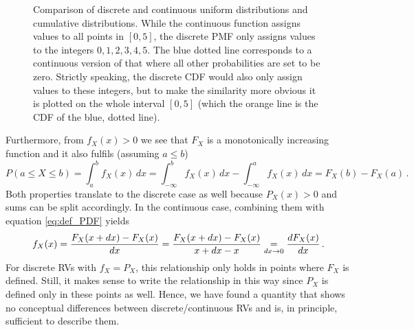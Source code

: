 \begin{figure}
\centering

%
\hspace{0.04\textwidth}%
%

\caption{Comparison of discrete and continuous uniform distributions and cumulative distributions. While the continuous function assigns values to all points in $[0, 5]$, the discrete PMF only assigns values to the integers $0, 1, 2, 3, 4, 5$. The blue dotted line corresponds to a continuous version of that where all other probabilities are set to be zero. Strictly speaking, the discrete CDF would also only assign values to these integers, but to make the similarity more obvious it is plotted on the whole interval $[0, 5]$ (which the orange line is the CDF of the blue, dotted line).}
\label{fig:CDF_comparison}
\end{figure}



Furthermore, from $f_X(x) > 0$ we see that $F_X$ is a monotonically increasing function and it also fulfils (assuming $a \leq b$)
\begin{equation}
P(a \leq X \leq b) = \int_a^b f_X(x) \, dx = \int_{-\infty}^b f_X(x) \, dx - \int_{-\infty}^a f_X(x) \, dx = F_X(b) - F_X(a) \, .
\end{equation}
Both properties translate to the discrete case as well because $P_X(x) > 0$ and sums can be split accordingly. In the continuous case, combining them with equation \eqref{eq:def_PDF} yields
\begin{equation}
f_X(x) = \frac{F_X(x + dx) - F_X(x)}{dx} = \frac{F_X(x + dx) - F_X(x)}{x + dx - x} \underset{dx \rightarrow 0}{=} \dv{F_X(x)}{x} \, .
\end{equation}
For discrete RVs with $f_X = P_X$, this relationship only holds in points where $F_X$ is defined. Still, it makes sense to write the relationship in this way since $P_X$ is defined only in these points as well. Hence, we have found a quantity that shows no conceptual differences between discrete/continuous RVs and is, in principle, sufficient to describe them.\\


